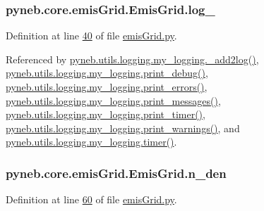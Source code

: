 \subsubsection[{log\+\_\+}]{\setlength{\rightskip}{0pt plus 5cm}pyneb.\+core.\+emis\+Grid.\+Emis\+Grid.\+log\+\_\+}\label{classpyneb_1_1core_1_1emis_grid_1_1_emis_grid_a1a53003d1e4a12bbc4ff9233a3fcd54a}


Definition at line \hyperlink{emis_grid_8py_source_l00040}{40} of file \hyperlink{emis_grid_8py_source}{emis\+Grid.\+py}.



Referenced by \hyperlink{logging_8py_source_l00059}{pyneb.\+utils.\+logging.\+my\+\_\+logging.\+\_\+add2log()}, \hyperlink{logging_8py_source_l00157}{pyneb.\+utils.\+logging.\+my\+\_\+logging.\+print\+\_\+debug()}, \hyperlink{logging_8py_source_l00149}{pyneb.\+utils.\+logging.\+my\+\_\+logging.\+print\+\_\+errors()}, \hyperlink{logging_8py_source_l00133}{pyneb.\+utils.\+logging.\+my\+\_\+logging.\+print\+\_\+messages()}, \hyperlink{logging_8py_source_l00165}{pyneb.\+utils.\+logging.\+my\+\_\+logging.\+print\+\_\+timer()}, \hyperlink{logging_8py_source_l00141}{pyneb.\+utils.\+logging.\+my\+\_\+logging.\+print\+\_\+warnings()}, and \hyperlink{logging_8py_source_l00115}{pyneb.\+utils.\+logging.\+my\+\_\+logging.\+timer()}.

\hypertarget{classpyneb_1_1core_1_1emis_grid_1_1_emis_grid_a6e0bddbe2d14b13fe1270a74b5b9ac0c}{}
\subsubsection[{n\+\_\+den}]{\setlength{\rightskip}{0pt plus 5cm}pyneb.\+core.\+emis\+Grid.\+Emis\+Grid.\+n\+\_\+den}\label{classpyneb_1_1core_1_1emis_grid_1_1_emis_grid_a6e0bddbe2d14b13fe1270a74b5b9ac0c}


Definition at line \hyperlink{emis_grid_8py_source_l00060}{60} of file \hyperlink{emis_grid_8py_source}{emis\+Grid.\+py}.

\hypertarget{classpyneb_1_1core_1_1emis_grid_1_1_emis_grid_a7a86bfc0cd3ed0d14ccaf950fb183696}{}
